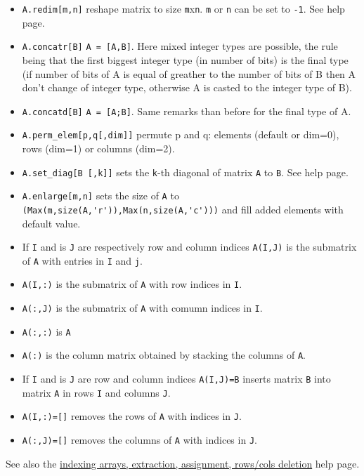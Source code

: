 \begin{itemize}
\item \verb+A.redim[m,n]+ reshape matrix to size \verb+m+x\verb+n+. \verb+m+ or \verb+n+ can be set to \verb+-1+. See
   help page.
\item \verb+A.concatr[B]+ \verb+A = [A,B]+. Here mixed integer types are possible, the rule being that the first biggest
 integer type (in number of bits) is the final type (if number of bits of A is equal of greather to the number of bits 
of B then A don't  change of integer type, otherwise A is casted to the integer type of B). 
\item \verb+A.concatd[B]+ \verb+A = [A;B]+. Same remarks than before for the final type of A.
\item \verb+A.perm_elem[p,q[,dim]]+ permute p and q: elements
  (default or dim=0), rows (dim=1) or columns (dim=2).
\item \verb+A.set_diag[B [,k]]+ sets the \verb+k+-th diagonal of matrix \verb+A+ to \verb+B+. See
   help page.
\item \verb+A.enlarge[m,n]+ sets the size of \verb+A+ to \verb+(Max(m,size(A,'r')),Max(n,size(A,'c')))+ and fill 
  added elements with default value.
\end{itemize}

\begin{itemize}
   \item If \verb+I+ and is \verb+J+ are respectively row and column indices \verb+A(I,J)+ is the submatrix of \verb+A+ with entries in \verb+I+ and \verb+j+.
   \item \verb+A(I,:)+ is the submatrix of \verb+A+ with row indices in \verb+I+.
   \item \verb+A(:,J)+ is the submatrix of \verb+A+ with comumn indices in \verb+I+.
   \item \verb+A(:,:)+ is \verb+A+
   \item \verb+A(:)+  is the column matrix obtained by stacking the columns of \verb+A+.
\end{itemize}
\begin{itemize}
   \item If \verb+I+ and is \verb+J+ are row and column indices \verb+A(I,J)=B+ inserts
matrix \verb+B+ into matrix \verb+A+ in rows \verb+I+ and columns \verb!J!.
   \item \verb+A(I,:)=[]+ removes the rows of \verb+A+ with indices in \verb+J+.
   \item \verb+A(:,J)=[]+ removes the columns of \verb+A+ with indices in \verb+J+.
\end{itemize}
See also the \hyperlink{indexing arrays}{indexing arrays, extraction, assignment, rows/cols deletion} help page.

